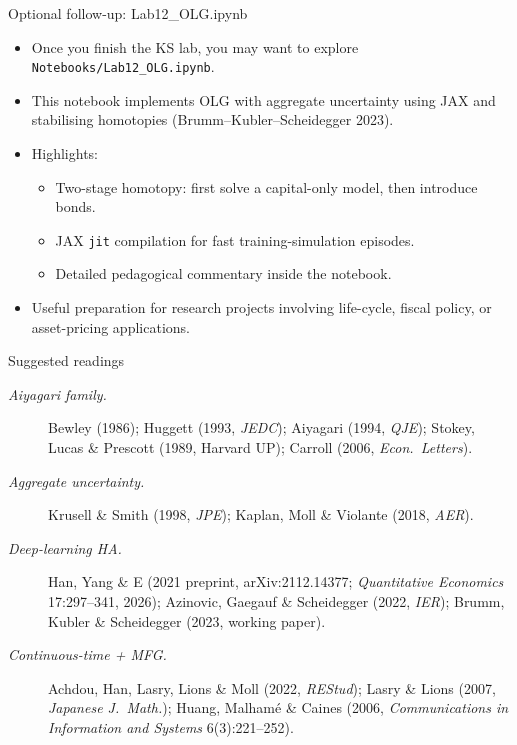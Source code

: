 \begin{frame}{Optional follow-up: Lab12\_OLG.ipynb}
\begin{itemize}
\item Once you finish the KS lab, you may want to explore \texttt{Notebooks/Lab12\_OLG.ipynb}.
\medskip
\item This notebook implements OLG with aggregate uncertainty using JAX and stabilising homotopies (Brumm--Kubler--Scheidegger 2023).
\medskip
\item Highlights:
  \begin{itemize}
  \item Two-stage homotopy: first solve a capital-only model, then introduce bonds.
  \item JAX \texttt{jit} compilation for fast training-simulation episodes.
  \item Detailed pedagogical commentary inside the notebook.
  \end{itemize}
\medskip
\item Useful preparation for research projects involving life-cycle, fiscal policy, or asset-pricing applications.
\end{itemize}
\end{frame}

\begin{frame}{Suggested readings}
\begin{description}
\item[\textit{Aiyagari family.}] Bewley (1986); Huggett (1993, \emph{JEDC}); Aiyagari (1994, \emph{QJE}); Stokey, Lucas \& Prescott (1989, Harvard UP); Carroll (2006, \emph{Econ.\ Letters}).
\medskip
\item[\textit{Aggregate uncertainty.}] Krusell \& Smith (1998, \emph{JPE}); Kaplan, Moll \& Violante (2018, \emph{AER}).
\medskip
\item[\textit{Deep-learning HA.}] Han, Yang \& E (2021 preprint, arXiv:2112.14377; \emph{Quantitative Economics} 17:297--341, 2026); Azinovic, Gaegauf \& Scheidegger (2022, \emph{IER}); Brumm, Kubler \& Scheidegger (2023, working paper).
\medskip
\item[\textit{Continuous-time + MFG.}] Achdou, Han, Lasry, Lions \& Moll (2022, \emph{REStud}); Lasry \& Lions (2007, \emph{Japanese J.\ Math.}); Huang, Malham\'e \& Caines (2006, \emph{Communications in Information and Systems} 6(3):221--252).
\end{description}
\end{frame}

